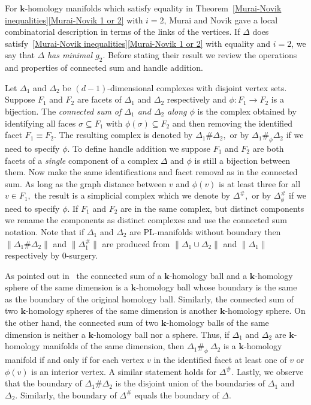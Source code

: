 \documentclass[ALCO,ThmDefs,Unicode,epreuves]{cedram}
\newcommand{\field}{\mathbf{k}}
\begin{document}
For $\field$-homology manifolds which satisfy equality in Theorem~\ref{Murai-Novik inequalities}\eqref{Murai-Novik 1 or 2} with $i=2$, Murai and Novik gave a local combinatorial description in terms of the links of the vertices. If $\Delta$ does satisfy~\ref{Murai-Novik inequalities}\eqref{Murai-Novik 1 or 2} with equality and $i=2$, we say that $\Delta$ \emph{has minimal $g_2.$} Before stating their result we review the operations and properties of connected sum and handle addition. 

 Let $\Delta_1$ and $\Delta_2$ be $(d-1)$-dimensional complexes with disjoint vertex sets. Suppose $F_1$ and $F_2$ are facets of $\Delta_1$ and $\Delta_2$ respectively and $\phi:F_1 \to F_2$ is a bijection. The \emph{connected sum of $\Delta_1$ and $\Delta_2$ along $\phi$} is the complex obtained by identifying all faces $\sigma \subseteq F_1$ with $\phi(\sigma) \subseteq F_2$ and then removing the identified facet $F_1 \equiv F_2.$ The resulting complex is denoted by $\Delta_1 \# \Delta_2,$ or by $\Delta_1 \#_\phi \Delta_2$ if we need to specify $\phi.$ To define handle addition we suppose $F_1$ and $F_2$ are both facets of a \emph{single} component of a complex $\Delta$ and $\phi$ is still a bijection between them. Now make the same identifications and facet removal as in the connected sum. As long as the graph distance between $v$ and $\phi(v)$ is at least three for all $v \in F_1,$ the result is a simplicial complex which we denote by $\Delta^{\#},$ or by $\Delta^{\#}_\phi$ if we need to specify $\phi.$ If $F_1$ and $F_2$ are in the same complex, but distinct components we rename the components as distinct complexes and use the connected sum notation. Note that if $\Delta_1$ and $\Delta_2$ are PL-manifolds without boundary then $\|\Delta_1\#\Delta_2\|$ and $\|\Delta_1^{\#}\|$ are produced from $\|\Delta_1\cup\Delta_2\|$ and $\|\Delta_1\|$ respectively by $0$-surgery.
 
 As pointed out in~\cite[Lemma~7.7]{Murai-Novik-bdry} the connected sum of a $\field$-homology ball and a $\field$-homology sphere of the same dimension is a $\field$-homology ball whose boundary is the same as the boundary of the original homology ball. Similarly, the connected sum of two $\field$-homology spheres of the same dimension is another $\field$-homology sphere. On the other hand, the connected sum of two $\field$-homology balls of the same dimension is neither a $\field$-homology ball nor a sphere. Thus, if $\Delta_1$ and $\Delta_2$ are $\field$-homology manifolds of the same dimension, then $\Delta_1 \#_\phi~\Delta_2$ is a $\field$-homology manifold if and only if for each vertex $v$ in the identified facet at least one of $v$ or $\phi(v)$ is an interior vertex. A similar statement holds for $\Delta^\#.$ Lastly, we observe that the boundary of $\Delta_1 \# \Delta_2$ is the disjoint union of the boundaries of $\Delta_1$ and $\Delta_2.$ Similarly, the boundary of $\Delta^\#$ equals the boundary of $\Delta.$ 
 
\end{document}
